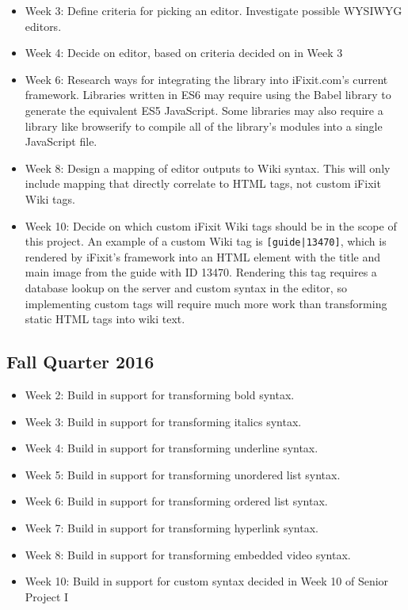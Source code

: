 \documentclass[letterpaper]{article}
\begin{document}
\begin{itemize}
\item Week 3:
Define criteria for picking an editor.
Investigate possible WYSIWYG editors.

\item Week 4:
Decide on editor, based on criteria decided on in Week 3

\item Week 6:
Research ways for integrating the library into iFixit.com’s current framework. Libraries written in ES6 may require using the Babel library to generate the equivalent ES5 JavaScript. Some libraries may also require a library like browserify to compile all of the library’s modules into a single JavaScript file.

\item Week 8:
Design a mapping of editor outputs to Wiki syntax. This will only include mapping that directly correlate to HTML tags, not custom iFixit Wiki tags.

\item Week 10:
Decide on which custom iFixit Wiki tags should be in the scope of this project. An example of a custom Wiki tag is \texttt{[guide|13470]}, which is rendered by iFixit’s framework into an HTML element with the title and main image from the guide with ID 13470. Rendering this tag requires a database lookup on the server and custom syntax in the editor, so implementing custom tags will require much more work than transforming static HTML tags into wiki text.

\end{itemize}

\subsection{Fall Quarter 2016}

\begin{itemize}

\item Week 2: Build in support for transforming bold syntax.

\item Week 3: Build in support for transforming italics syntax.

\item Week 4: Build in support for transforming underline syntax.

\item Week 5: Build in support for transforming unordered list syntax.

\item Week 6: Build in support for transforming ordered list syntax.

\item Week 7: Build in support for transforming hyperlink syntax.

\item Week 8: Build in support for transforming embedded video syntax.

\item Week 10: Build in support for custom syntax decided in Week 10 of Senior Project I

\end{itemize}
\end{document}
